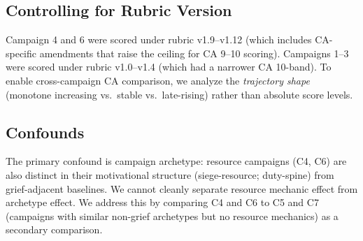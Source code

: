 \subsection{Controlling for Rubric Version}

Campaign 4 and 6 were scored under rubric v1.9--v1.12 (which includes CA-specific
amendments that raise the ceiling for CA 9--10 scoring). Campaigns 1--3 were scored
under rubric v1.0--v1.4 (which had a narrower CA 10-band). To enable cross-campaign
CA comparison, we analyze the \textit{trajectory shape} (monotone increasing vs.\ stable
vs.\ late-rising) rather than absolute score levels.

\subsection{Confounds}

The primary confound is campaign archetype: resource campaigns (C4, C6) are also distinct
in their motivational structure (siege-resource; duty-spine) from grief-adjacent baselines.
We cannot cleanly separate resource mechanic effect from archetype effect. We address
this by comparing C4 and C6 to C5 and C7 (campaigns with similar non-grief archetypes
but no resource mechanics) as a secondary comparison.
